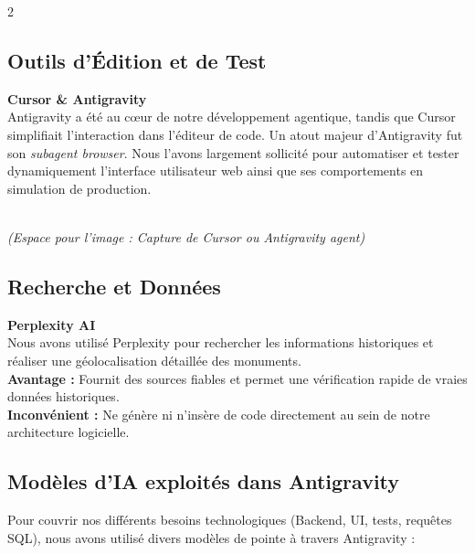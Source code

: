 \documentclass[12pt,a4paper]{article}
\begin{document}
\begin{multicols}{2}
\subsection*{Outils d'Édition et de Test}
\textbf{Cursor \& Antigravity} \\
Antigravity a été au cœur de notre développement agentique, tandis que Cursor simplifiait l'interaction dans l'éditeur de code. Un atout majeur d'Antigravity fut son \textit{subagent browser}. Nous l'avons largement sollicité pour automatiser et tester dynamiquement l'interface utilisateur web ainsi que ses comportements en simulation de production.\par
\vspace{0.3cm}
\noindent\fbox{\rule{0pt}{2cm} \rule{0.9\linewidth}{0pt}} \\
\textit{\small (Espace pour l'image : Capture de Cursor ou Antigravity agent)}

\columnbreak

\subsection*{Recherche et Données}
\textbf{Perplexity AI} \\
Nous avons utilisé Perplexity pour rechercher les informations historiques et réaliser une géolocalisation détaillée des monuments. \\
\textbf{Avantage :} Fournit des sources fiables et permet une vérification rapide de vraies données historiques. \\
\textbf{Inconvénient :} Ne génère ni n'insère de code directement au sein de notre architecture logicielle.
\end{multicols}

\subsection*{Modèles d'IA exploités dans Antigravity}
Pour couvrir nos différents besoins technologiques (Backend, UI, tests, requêtes SQL), nous avons utilisé divers modèles de pointe à travers Antigravity :
\end{document}

